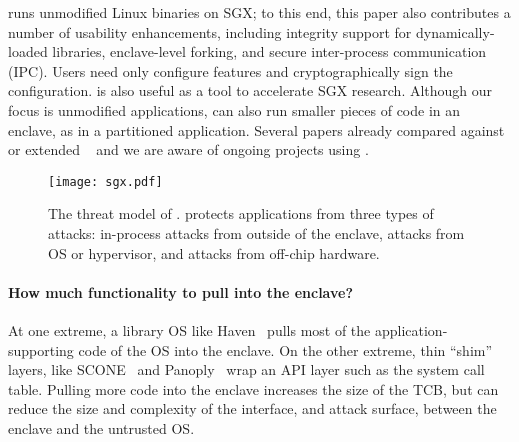 \graphenesgx{} runs unmodified Linux binaries on SGX; to this end,
this paper also contributes a number of usability enhancements,
including integrity support for dynamically-loaded libraries,
enclave-level forking, and secure inter-process communication (IPC).
Users need only configure features and cryptographically sign the configuration.
\graphenesgx{} is also useful as a tool to accelerate SGX research.
Although our focus is unmodified applications, \graphenesgx{} can also run smaller pieces of
code in an enclave, as in a partitioned application.
Several papers already compared against or extended 
\graphenesgx{}~\cite{shinde17panoply, orenbach17eleos, kim2017enhancing}
and we are aware of ongoing projects using \graphenesgx{}.



\begin{figure}[t!]
\centering
\texttt{[image: sgx.pdf]}
\caption{The threat model of \sgx{}. \sgx{} protects applications
from three types of attacks:
in-process attacks from outside of the enclave,
attacks from OS or hypervisor, and attacks from off-chip hardware.}
\label{fig:sgx-threats}
\end{figure}

\paragraph{How much functionality to pull into the enclave?}
At one extreme, a library OS like Haven~\cite{baumann14haven} pulls most
of the application-supporting code of the OS into the enclave.
On the other extreme, thin ``shim'' layers, like SCONE~\cite{osdi16scone} and Panoply~\cite{shinde17panoply} 
wrap an API layer such as the system call table.
Pulling more code into the enclave increases the size of the TCB,
but can reduce the size and complexity of the interface, and attack surface, 
between the enclave
and the untrusted OS.


